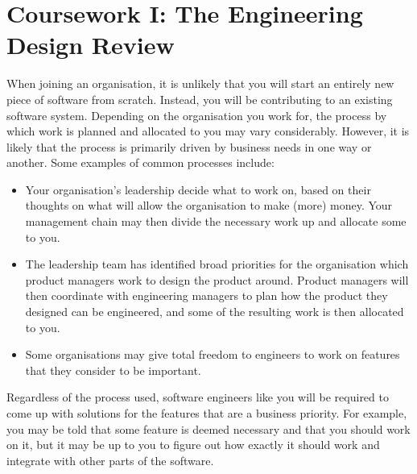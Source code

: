 
\clearpage
\section{Coursework I: The Engineering Design Review}

When joining an organisation, it is unlikely that you will start an entirely new piece of software from scratch. Instead, you will be contributing to an existing software system. Depending on the organisation you work for, the process by which work is planned and allocated to you may vary considerably. However, it is likely that the process is primarily driven by business needs in one way or another. Some examples of common processes include:

\begin{itemize}
    \item Your organisation's leadership decide what to work on, based on their thoughts on what will allow the organisation to make (more) money. Your management chain may then divide the necessary work up and allocate some to you.
    \item The leadership team has identified broad priorities for the organisation which product managers work to design the product around. Product managers will then coordinate with engineering managers to plan how the product they designed can be engineered, and some of the resulting work is then allocated to you.
    \item Some organisations may give total freedom to engineers to work on features that they consider to be important.
\end{itemize}

Regardless of the process used, software engineers like you will be required to come up with solutions for the features that are a business priority. For example, you may be told that some feature is deemed necessary and that you should work on it, but it may be up to you to figure out how exactly it should work and integrate with other parts of the software.

